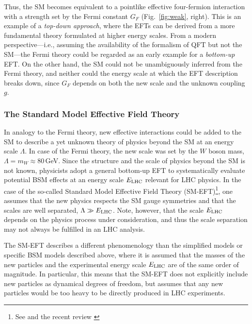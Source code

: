 Thus, the SM becomes equivalent to a pointlike effective four-fermion interaction with a strength set by the Fermi constant $G_F$ (Fig.~\ref{fig:weak}, right). 
This is an example of a \textit{top-down approach}, where the EFTs can be derived from a more fundamental theory formulated at higher energy scales.
From a modern perspective---i.e., assuming the availability of the formalism of QFT but not the SM---the Fermi theory could be regarded as an
early example for a \textit{bottom-up} EFT. 
On the other hand, the SM could not be unambiguously inferred from the Fermi theory, and neither
could the energy scale at which the EFT description breaks down, since $G_F$ depends 
on both the new scale and the unknown coupling $g$. 


\subsubsection{The Standard Model Effective Field Theory} \label{sec:smeftphysics}


In analogy to the Fermi theory, new effective interactions could be added
to the SM to describe a yet unknown theory of physics beyond the SM at
an energy scale $\Lambda$. In case of the Fermi theory, the new scale
was set by the $W$ boson mass, $\Lambda = m_W \approx 80$\,GeV. Since the structure and the
scale of physics beyond the
SM is not known, physicists adopt a
general bottom-up EFT to systematically evaluate potential BSM
effects at an energy scale $E_{\rm LHC}$  relevant for LHC physics. In the case of the
so-called 
Standard Model Effective Field Theory (SM-EFT)\footnote{See \cite{Buchmuller:1985jz,Grzadkowski:2010es} and the recent review
\cite{Brivio:2017vri}}, one assumes that the
new physics respects the SM gauge symmetries and that the scales are
well separated, $\Lambda\gg E_{\rm LHC}$. Note, however, that the
scale $E_{\rm LHC}$ depends on the physics process under
consideration, and thus the scale separation may not always be fulfilled in an LHC analysis. 

The SM-EFT describes a different phenomenology than the simplified
models or specific BSM models described above, where it is assumed that the masses of the new
particles and the experimental energy scale $E_{\rm LHC}$ are of the same
order of magnitude. In particular, this means that the SM-EFT does not
explicitly include new particles as dynamical degrees of freedom, but
assumes that any new particles would be too heavy to be directly produced in LHC experiments. 

